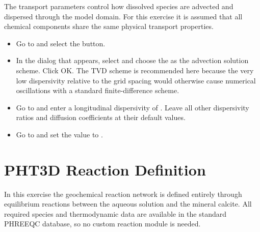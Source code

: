 The transport parameters control how dissolved species are advected and
dispersed through the model domain.  For this exercise it is assumed
that all chemical components share the same physical transport
properties.

\begin{itemize}

\item Go to  and select the
   button.

\item In the dialog that appears, select  and choose the
   as the advection solution
  scheme.  Click OK\@.  The TVD scheme is recommended here because the
  very low dispersivity relative to the grid spacing would otherwise
  cause numerical oscillations with a standard finite-difference scheme.

\item Go to  and enter a longitudinal dispersivity of
  .  Leave all other dispersivity ratios and diffusion
  coefficients at their default values.

\item Go to  and set the value to
  .

\end{itemize}

\section{PHT3D Reaction Definition}

In this exercise the geochemical reaction network is defined entirely
through equilibrium reactions between the aqueous solution and the
mineral calcite.  All required species and thermodynamic data are
available in the standard PHREEQC database, so no custom reaction
module is needed.

